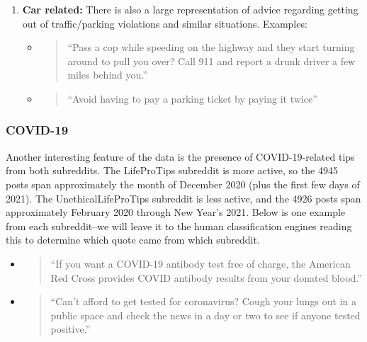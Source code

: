 \documentclass{amsart}
\theoremstyle{definition}
\theoremstyle{remark}
\newcommand{\tql}{\textquotedblleft}
\newcommand{\tqr}{\textquotedblright}
\begin{document}
\begin{enumerate}
\begin{itemize}

\end{itemize}

\item \textbf{Car related:} There is also a large representation of advice regarding getting out of traffic/parking violations and similar situations.  Examples:

\begin{itemize}

\item \begin{quote}
\tql Pass a cop while speeding on the highway and they start turning around to pull you over? Call 911 and report a drunk driver a few miles behind you.\tqr
\end{quote}

\item \begin{quote}
\tql Avoid having to pay a parking ticket by paying it twice\tqr
\end{quote}

\end{itemize}

\end{enumerate}

\subsubsection{COVID-19} Another interesting feature of the data is the presence of COVID-19-related tips from both subreddits.  The LifeProTips subreddit is more active, so the 4945 posts span approximately the month of December 2020 (plus the first few days of 2021).  The UnethicalLifeProTips subreddit is less active, and the 4926 posts span approximately February 2020 through New Year's 2021. Below is one example from each subreddit--we will leave it to the human classification engines reading this to determine which quote came from which subreddit.

\begin{itemize}

\item \begin{quote}
\tql If you want a COVID-19 antibody test free of charge, the American Red Cross provides COVID antibody results from your donated blood.\tqr
\end{quote}

\item \begin{quote}
\tql Can't afford to get tested for coronavirus? Cough your lungs out in a public space and check the news in a day or two to see if anyone tested positive.\tqr
\end{quote}	

\end{itemize}
\end{document}
